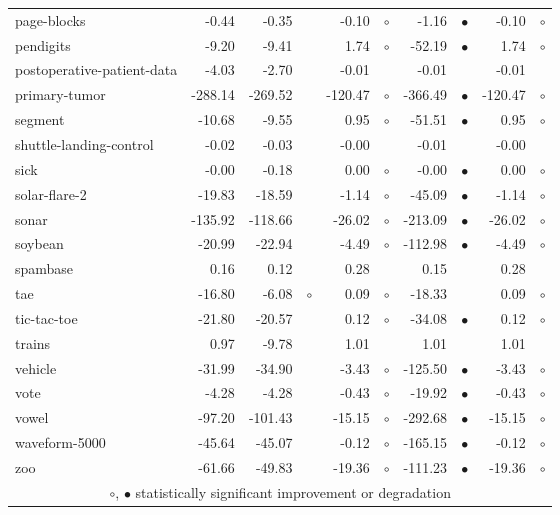 {\begin{longtable}{lrr@{\hspace{0.1cm}}cr@{\hspace{0.1cm}}cr@{\hspace{0.1cm}}cr@{\hspace{0.1cm}}c}
page-blocks &   -0.44 &   -0.35 &           &   -0.10 &  $\circ$ &   -1.16 & $\bullet$ &   -0.10 &  $\circ$\\
pendigits &   -9.20 &   -9.41 &           &    1.74 &  $\circ$ &  -52.19 & $\bullet$ &    1.74 &  $\circ$\\
postoperative-patient-data &   -4.03 &   -2.70 &           &   -0.01 &          &   -0.01 &           &   -0.01 &         \\
primary-tumor & -288.14 & -269.52 &           & -120.47 &  $\circ$ & -366.49 & $\bullet$ & -120.47 &  $\circ$\\
segment &  -10.68 &   -9.55 &           &    0.95 &  $\circ$ &  -51.51 & $\bullet$ &    0.95 &  $\circ$\\
shuttle-landing-control &   -0.02 &   -0.03 &           &   -0.00 &          &   -0.01 &           &   -0.00 &         \\
sick &   -0.00 &   -0.18 &           &    0.00 &  $\circ$ &   -0.00 & $\bullet$ &    0.00 &  $\circ$\\
solar-flare-2 &  -19.83 &  -18.59 &           &   -1.14 &  $\circ$ &  -45.09 & $\bullet$ &   -1.14 &  $\circ$\\
sonar & -135.92 & -118.66 &           &  -26.02 &  $\circ$ & -213.09 & $\bullet$ &  -26.02 &  $\circ$\\
soybean &  -20.99 &  -22.94 &           &   -4.49 &  $\circ$ & -112.98 & $\bullet$ &   -4.49 &  $\circ$\\
spambase &    0.16 &    0.12 &           &    0.28 &          &    0.15 &           &    0.28 &         \\
tae &  -16.80 &   -6.08 &   $\circ$ &    0.09 &  $\circ$ &  -18.33 &           &    0.09 &  $\circ$\\
tic-tac-toe &  -21.80 &  -20.57 &           &    0.12 &  $\circ$ &  -34.08 & $\bullet$ &    0.12 &  $\circ$\\
trains &    0.97 &   -9.78 &           &    1.01 &          &    1.01 &           &    1.01 &         \\
vehicle &  -31.99 &  -34.90 &           &   -3.43 &  $\circ$ & -125.50 & $\bullet$ &   -3.43 &  $\circ$\\
vote &   -4.28 &   -4.28 &           &   -0.43 &  $\circ$ &  -19.92 & $\bullet$ &   -0.43 &  $\circ$\\
vowel &  -97.20 & -101.43 &           &  -15.15 &  $\circ$ & -292.68 & $\bullet$ &  -15.15 &  $\circ$\\
waveform-5000 &  -45.64 &  -45.07 &           &   -0.12 &  $\circ$ & -165.15 & $\bullet$ &   -0.12 &  $\circ$\\
zoo &  -61.66 &  -49.83 &           &  -19.36 &  $\circ$ & -111.23 & $\bullet$ &  -19.36 &  $\circ$\\
\hline
\multicolumn{10}{c}{$\circ$, $\bullet$ statistically significant improvement or degradation}\\
\end{longtable} \footnotesize \par}